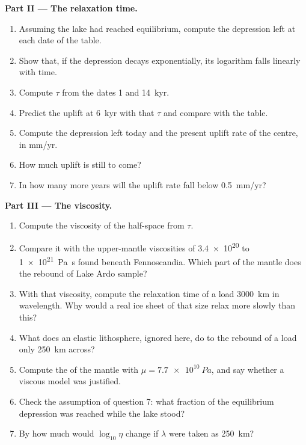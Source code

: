 \begin{problem}
\medskip\noindent\textbf{Part II --- The relaxation time.}
\begin{enumerate}[resume]
  \item Assuming the lake had reached equilibrium, compute the depression left
        at each date of the table.
  \item Show that, if the depression decays exponentially, its logarithm falls
        linearly with time.
  \item Compute $\tau$ from the dates 1 and \qty{14}{kyr}.
  \item Predict the uplift at \qty{6}{kyr} with that $\tau$ and compare with the
        table.
  \item Compute the depression left today and the present uplift rate of the
        centre, in \unit{mm/yr}.
  \item How much uplift is still to come?
  \item In how many more years will the uplift rate fall below
        \qty{0.5}{mm/yr}?
\end{enumerate}

\medskip\noindent\textbf{Part III --- The viscosity.}
\begin{enumerate}[resume]
  \item Compute the viscosity of the half-space from $\tau$.
  \item Compare it with the upper-mantle viscosities of \num{3.4e20} to
        \qty{1e21}{Pa.s} found beneath Fennoscandia. Which part of the mantle
        does the rebound of Lake Ardo sample?
  \item With that viscosity, compute the relaxation time of a load
        \qty{3000}{km} in wavelength. Why would a real ice sheet of that size
        relax more slowly than this?
  \item What does an elastic lithosphere, ignored here, do to the rebound of a
        load only \qty{250}{km} across?
  \item Compute the  of the mantle with $\mu = \qty{7.7e10}{Pa}$,
        and say whether a viscous model was justified.
  \item Check the assumption of question 7: what fraction of the equilibrium
        depression was reached while the lake stood?
  \item By how much would $\log_{10}\eta$ change if $\lambda$ were taken as
        \qty{250}{km}?
\end{enumerate}


\end{problem}
